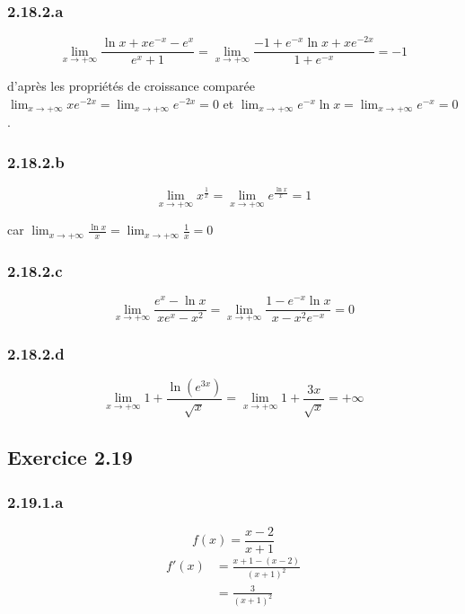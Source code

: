 \documentclass[a4paper,10pt]{report}
\begin{document}
\subsubsection*{2.18.2.a}
\begin{displaymath}
	\lim_{x \rightarrow +\infty} \frac{\ln x + xe^{-x}-e^x}{e^x+1} = \lim_{x \rightarrow +\infty} \frac{-1 + e^{-x}\ln x + xe^{-2x}}{1 +e^{-x}} = -1
\end{displaymath}

d'après les propriétés de croissance comparée $\lim_{x \rightarrow +\infty} xe^{-2x} = \lim_{x \rightarrow +\infty} e^{-2x} = 0$ et 
$\lim_{x \rightarrow +\infty} e^{-x}\ln x = \lim_{x \rightarrow +\infty} e^{-x} =0 $.

\subsubsection*{2.18.2.b}
\begin{displaymath}
	\lim_{x \rightarrow +\infty} x^{\frac{1}{x}} = \lim_{x \rightarrow +\infty} e^\frac{\ln x}{x} = 1
\end{displaymath}

car $\lim_{x \rightarrow +\infty} \frac{\ln x}{x} = \lim_{x \rightarrow +\infty} \frac{1}{x} = 0$

\subsubsection*{2.18.2.c}
\begin{displaymath}
	\lim_{x \rightarrow +\infty} \frac{e^x - \ln x}{xe^x-x^2} = \lim_{x \rightarrow +\infty} \frac{1 - e^{-x}\ln x}{x-x^2e^{-x}} = 0
\end{displaymath}

\subsubsection*{2.18.2.d}
\begin{displaymath}
	\lim_{x \rightarrow +\infty} 1+ \frac{\ln (e^{3x})}{\sqrt{x}} = \lim_{x \rightarrow +\infty} 1+ \frac{3x}{\sqrt{x}} = +\infty
\end{displaymath}


\subsection*{Exercice 2.19}
\subsubsection*{2.19.1.a}
\begin{displaymath}
	f(x) = \frac{x-2}{x+1}
\end{displaymath}
\begin{equation*}
	\begin{split}
		f'(x) &=\frac{x+1 - (x-2)}{(x+1)^2}\\
		      &=\frac{3}{(x+1)^2}
	\end{split}	
\end{equation*}
\end{document}
